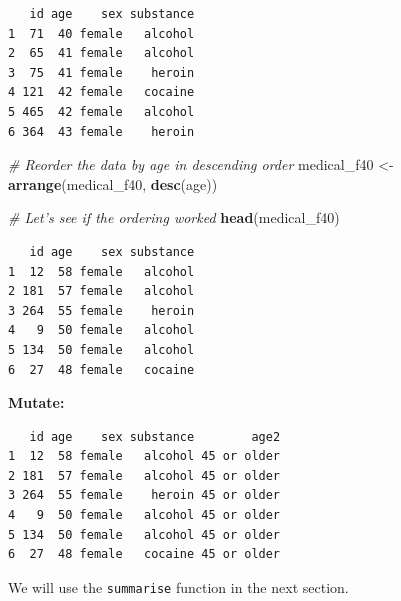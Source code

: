 \documentclass[]{book}
\newenvironment{Shaded}{\begin{snugshade}}{\end{snugshade}}
\newcommand{\CommentTok}[1]{\textcolor[rgb]{0.56,0.35,0.01}{\textit{#1}}}
\newcommand{\DataTypeTok}[1]{\textcolor[rgb]{0.13,0.29,0.53}{#1}}
\newcommand{\DecValTok}[1]{\textcolor[rgb]{0.00,0.00,0.81}{#1}}
\newcommand{\KeywordTok}[1]{\textcolor[rgb]{0.13,0.29,0.53}{\textbf{#1}}}
\newcommand{\NormalTok}[1]{#1}
\newcommand{\OperatorTok}[1]{\textcolor[rgb]{0.81,0.36,0.00}{\textbf{#1}}}
\newcommand{\StringTok}[1]{\textcolor[rgb]{0.31,0.60,0.02}{#1}}
\begin{document}
\begin{verbatim}
   id age    sex substance
1  71  40 female   alcohol
2  65  41 female   alcohol
3  75  41 female    heroin
4 121  42 female   cocaine
5 465  42 female   alcohol
6 364  43 female    heroin
\end{verbatim}

\begin{Shaded}
\begin{Highlighting}[]
\CommentTok{# Reorder the data by age in descending order}
\NormalTok{medical_f40 <-}\StringTok{ }\KeywordTok{arrange}\NormalTok{(medical_f40, }\KeywordTok{desc}\NormalTok{(age))}

\CommentTok{# Let's see if the ordering worked}
\KeywordTok{head}\NormalTok{(medical_f40)}
\end{Highlighting}
\end{Shaded}

\begin{verbatim}
   id age    sex substance
1  12  58 female   alcohol
2 181  57 female   alcohol
3 264  55 female    heroin
4   9  50 female   alcohol
5 134  50 female   alcohol
6  27  48 female   cocaine
\end{verbatim}

\textbf{Mutate:}

\begin{Shaded}
\end{Shaded}

\begin{verbatim}
   id age    sex substance        age2
1  12  58 female   alcohol 45 or older
2 181  57 female   alcohol 45 or older
3 264  55 female    heroin 45 or older
4   9  50 female   alcohol 45 or older
5 134  50 female   alcohol 45 or older
6  27  48 female   cocaine 45 or older
\end{verbatim}

We will use the \texttt{summarise} function in the next section.
\end{document}

